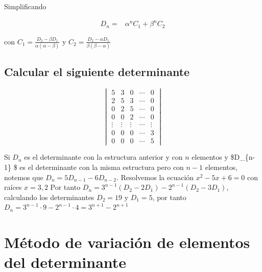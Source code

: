 \documentclass[
]{article}
\begin{document}
Simplificando

\begin{equation*}
\begin{array}{cc}
D_{n} = & \alpha^{n} C_1  +  \beta^{n} C_2   
\end{array}
\end{equation*}

con \(C_1 = \frac{D_2-\beta D_1}{\alpha(\alpha -\beta)}\) y
\(C_2 = \frac{D_2-\alpha D_1}{\beta(\beta - \alpha)}\)

\hypertarget{calcular-el-siguiente-determinante}{%
\subsection{Calcular el siguiente
determinante}\label{calcular-el-siguiente-determinante}}

\begin{equation}
  \begin{vmatrix}
     5        & 3       & 0     &   \cdots & 0      \\
     2        & 5       & 3     &   \cdots & 0      \\ 
     0        & 2       & 5     &   \cdots & 0      \\
     0        & 0       & 2     &   \cdots & 0      \\
     \vdots   & \vdots  & \vdots&   \cdots &\vdots  \\
     0        & 0       & 0     &   \cdots & 3      \\
     0        & 0       & 0     &   \cdots & 5    
  \end{vmatrix} 
\end{equation}

Si \(D_n\) es el determinante con la estructura anterior y con \(n\)
elementos y \$D\_\{n-1\} \$ es el determinante con la misma estructura
pero con \(n-1\) elementos, notemos que \(D_n = 5 D_{n-1} -6 D_{n-2}\).
Resolvemos la ecuación \(x^{2}-5x+6=0\) con raíces \(x=3,2\) Por tanto
\(D_n=3^{n-1}(D_2-2D_1)-2^{n-1}(D_2-3D_1)\), calculando los
determinantes \(D_2=19\) y \(D_1=5\), por tanto
\(D_n =3^{n-1}\cdot 9 - 2^{n-1}\cdot 4 = 3^{n+1}- 2^{n+1}\)

\hypertarget{muxe9todo-de-variaciuxf3n-de-elementos-del-determinante}{%
\section{Método de variación de elementos del
determinante}\label{muxe9todo-de-variaciuxf3n-de-elementos-del-determinante}}
\end{document}
